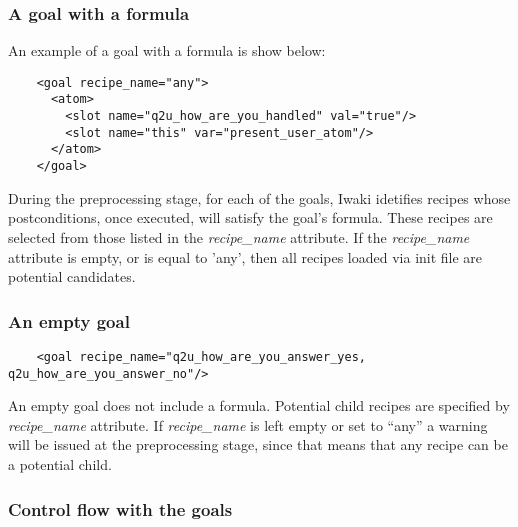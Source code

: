 \subsubsection{A goal with a formula}

An example of a goal with a formula is show below:

\lstset{language=XML}
\begin{lstlisting}
    <goal recipe_name="any">
      <atom>
        <slot name="q2u_how_are_you_handled" val="true"/>
        <slot name="this" var="present_user_atom"/>
      </atom>
    </goal>
\end{lstlisting}


During the preprocessing stage, for each of the goals, Iwaki idetifies recipes whose postconditions, once executed, will satisfy the goal's formula.  These recipes are selected from those listed in the \textsl{recipe\_name} attribute. If the \textsl{recipe\_name}  attribute is empty, or is equal to 'any', then all recipes loaded via init file are potential candidates. 
 
\subsubsection{An empty goal}

\lstset{language=XML}
\begin{lstlisting}
    <goal recipe_name="q2u_how_are_you_answer_yes, q2u_how_are_you_answer_no"/>
\end{lstlisting}

An empty goal does not include a formula. Potential child recipes are specified by \textsl{recipe\_name} attribute. If \textsl{recipe\_name} is left empty or set to ``any'' a warning will be issued at the preprocessing stage, since that means that any recipe can be a potential child.

\subsubsection{Control flow with the goals}


